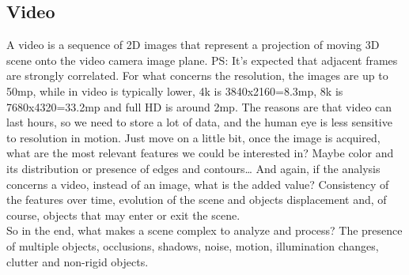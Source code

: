 \subsection{Video}
A video is a sequence of 2D images that represent a projection of moving 3D scene onto the video camera image plane. PS: It's expected that adjacent frames are strongly correlated.
For what concerns the resolution, the images are up to 50mp, while in video is typically lower, 4k is 3840x2160=8.3mp, 8k is 7680x4320=33.2mp and full HD is around 2mp.
The reasons are that video can last hours, so we need to store a lot of data, and the human eye is less sensitive to resolution in motion. 
Just move on a little bit, once the image is acquired, what are the most relevant features we could be interested in? Maybe color and its distribution or presence of edges and contours\dots
And again, if the analysis concerns a video, instead of an image, what is the added value?
Consistency of the features over time, evolution of the scene and objects displacement and, of course, objects that may enter or exit the scene.
\\So in the end, what makes a scene complex to analyze and process?
The presence of multiple objects, occlusions, shadows, noise, motion, illumination changes, clutter and non-rigid objects.
